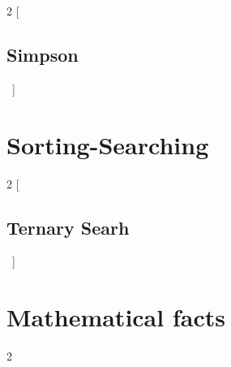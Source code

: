 \documentclass[leter]{amsart}
\newcommand{\includecpp}[3]{
  \begin{multicols}{2}
    [\subsection{#1}\ ]
    
  \end{multicols}
}
\begin{document}
    \includecpp{Simpson}{./Numeric}{Simpson.cpp}
    
	 \pagebreak
    
    \section{Sorting-Searching}
    
	    \includecpp{Ternary Searh}{./Sorting-Searching}{Ternary_Searh.cpp}
    
	\pagebreak
   
  
  \section{Mathematical facts}
  \begin{multicols}{2}
    
  \end{multicols}  

  \enlargethispage*{\baselineskip}
  \pagebreak
\end{document}
